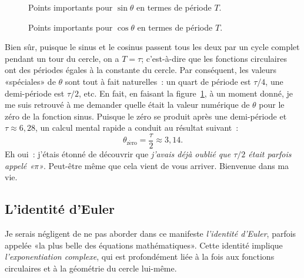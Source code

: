 \begin{figure}
\begin{center}
\end{center}
\caption{Points importants pour $\sin\theta$ en termes de période
$T$.\label{fig:sine_with_tau}}
\end{figure}

\begin{figure}
\begin{center}
\end{center}
\caption{Points importants pour $\cos\theta$ en termes de période
$T$.\label{fig:cosine_with_tau}}
\end{figure}

Bien sûr, puisque le sinus et le cosinus passent tous les deux par un cycle
complet pendant un tour du cercle, on a $T = \tau$\ns; c'est-à-dire que les
fonctions circulaires ont des périodes égales à la constante du cercle. Par
conséquent, les valeurs «\ns spéciales\ns »  de $\theta$ sont tout à fait
naturelles~: un quart de période est $\tau/4$, une demi-période est $\tau/2$,
etc. En fait, en faisant la figure~\ref{fig:sine_with_tau}, à un moment donné,
je me suis retrouvé à me demander quelle était la valeur numérique de $\theta$
pour le zéro de la fonction sinus. Puisque le zéro se produit après une
demi-période et $\tau \approx 6{,}28$, un calcul mental rapide a
conduit au résultat suivant~:
\[
  \theta_\mathrm{z\acute{e}ro} = \frac{\tau}{2} \approx 3{,}14.
\]
Eh oui~: j'étais étonné de découvrir que \emph{j'avais déjà oublié que
$\tau/2$ était parfois appelé «\ns $\pi$\ns »}. Peut-être même que cela vient de vous
arriver. Bienvenue dans ma vie.



   \subsection{L'identité d'Euler} %
   \label{sec:euler_s_identity}

Je serais négligent de ne pas aborder dans ce manifeste \emph{l'identité
d'Euler}, parfois appelée «\ns la plus belle des équations mathématiques\ns ». Cette
identité implique \emph{l'exponentiation complexe}, qui est profondément liée à
la fois aux fonctions circulaires et à la géométrie du cercle lui-même.

